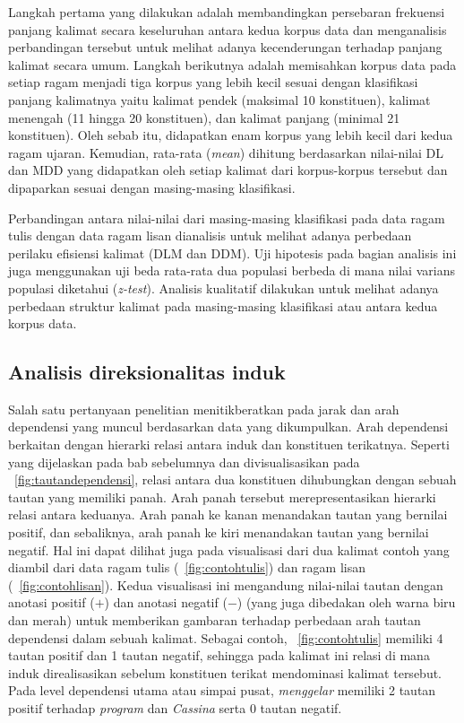 Langkah pertama yang dilakukan adalah membandingkan persebaran frekuensi panjang kalimat secara keseluruhan antara kedua korpus data dan menganalisis perbandingan tersebut untuk melihat adanya kecenderungan terhadap panjang kalimat secara umum. Langkah berikutnya adalah memisahkan korpus data pada setiap ragam menjadi tiga korpus yang lebih kecil sesuai dengan klasifikasi panjang kalimatnya yaitu kalimat pendek (maksimal 10 konstituen), kalimat menengah (11 hingga 20 konstituen), dan kalimat panjang (minimal 21 konstituen). Oleh sebab itu, didapatkan enam korpus yang lebih kecil dari kedua ragam ujaran. Kemudian, rata-rata (\textit{mean}) dihitung berdasarkan nilai-nilai DL dan MDD yang didapatkan oleh setiap kalimat dari korpus-korpus tersebut dan dipaparkan sesuai dengan masing-masing klasifikasi. 

Perbandingan antara nilai-nilai dari masing-masing klasifikasi pada data ragam tulis dengan data ragam lisan dianalisis untuk melihat adanya perbedaan perilaku efisiensi kalimat (DLM dan DDM). Uji hipotesis pada bagian analisis ini juga menggunakan uji beda rata-rata dua populasi berbeda di mana nilai varians populasi diketahui (\textit{z-test}). Analisis kualitatif dilakukan untuk melihat adanya perbedaan struktur kalimat pada masing-masing klasifikasi atau antara kedua korpus data.

\subsection{Analisis direksionalitas induk}
Salah satu pertanyaan penelitian menitikberatkan pada jarak dan arah dependensi yang muncul berdasarkan data yang dikumpulkan. Arah dependensi berkaitan dengan hierarki relasi antara induk dan konstituen terikatnya. Seperti yang dijelaskan pada bab sebelumnya dan divisualisasikan pada \pic~\ref{fig:tautandependensi}, relasi antara dua konstituen dihubungkan dengan sebuah tautan yang memiliki panah. Arah panah tersebut merepresentasikan hierarki relasi antara keduanya. Arah panah ke kanan menandakan tautan yang bernilai positif, dan sebaliknya, arah panah ke kiri menandakan tautan yang bernilai negatif. Hal ini dapat dilihat juga pada visualisasi dari dua kalimat contoh yang diambil dari data ragam tulis (\pic~\ref{fig:contohtulis}) dan ragam lisan (\pic~\ref{fig:contohlisan}). Kedua visualisasi ini mengandung nilai-nilai tautan dengan anotasi positif ($+$) dan anotasi negatif ($-$) (yang juga dibedakan oleh warna biru dan merah) untuk memberikan gambaran terhadap perbedaan arah tautan dependensi dalam sebuah kalimat. Sebagai contoh, \pic~\ref{fig:contohtulis} memiliki 4 tautan positif dan 1 tautan negatif, sehingga pada kalimat ini relasi di mana induk direalisasikan sebelum konstituen terikat mendominasi kalimat tersebut. Pada level dependensi utama atau simpai pusat, \textit{menggelar} memiliki 2 tautan positif terhadap \textit{program} dan \textit{Cassina} serta 0 tautan negatif.

